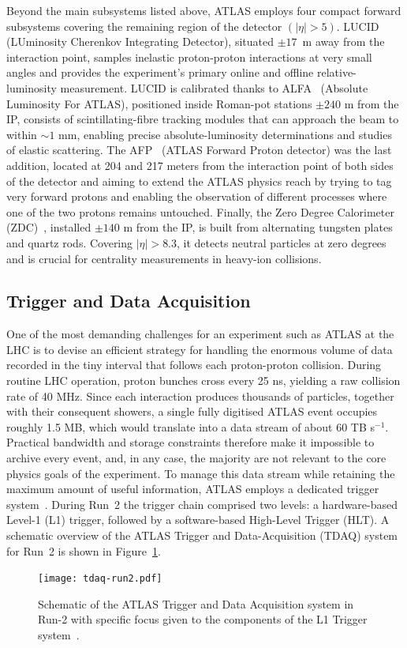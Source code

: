 Beyond the main subsystems listed above, ATLAS employs four compact forward subsystems covering the remaining region of the detector $(|\eta| > 5)$.
LUCID~\cite{Jenni:721908} (LUminosity Cherenkov Integrating Detector), situated $\pm17$~m away from the interaction point, samples inelastic proton-proton interactions at very small angles and provides the experiment’s primary online and offline relative-luminosity measurement.  
LUCID is calibrated thanks to ALFA~\cite{Khalek_2016} (Absolute Luminosity For ATLAS), positioned inside Roman-pot stations $\pm240$ m from the IP, consists of scintillating-fibre tracking modules that can approach the beam to within $\sim\!1$ mm, enabling precise absolute-luminosity determinations and studies of elastic scattering.  
The AFP~\cite{Adamczyk:2015cjy} (ATLAS Forward Proton detector) was the last addition, located at 204 and 217 meters from the interaction point of both sides of the detector and aiming to extend the ATLAS physics reach by trying to tag very forward protons and enabling the observation of different processes where one of the two protons remains untouched.
Finally, the Zero Degree Calorimeter (ZDC)~\cite{Jenni:1009649}, installed $\pm140$ m from the IP, is built from alternating tungsten plates and quartz rods.  Covering $|\eta| > 8.3$, it detects neutral particles at zero degrees and is crucial for centrality measurements in heavy-ion collisions.

\subsection{Trigger and Data Acquisition}
\label{sec:trigger}
One of the most demanding challenges for an experiment such as ATLAS at the LHC is to devise an efficient strategy for handling the enormous volume of data recorded in the tiny interval that follows each proton-proton collision. During routine LHC operation, proton bunches cross every 25 ns, yielding a raw collision rate of 40 MHz. Since each interaction produces thousands of particles, together with their consequent showers, a single fully digitised ATLAS event occupies roughly 1.5 MB, which would translate into a data stream of about 60 TB s$^{-1}$. Practical bandwidth and storage constraints therefore make it impossible to archive every event, and, in any case, the majority are not relevant to the core physics goals of the experiment. To manage this data stream while retaining the maximum amount of useful information, ATLAS employs a dedicated trigger system~\cite{trigger_run2}. During Run~2 the trigger chain comprised two levels: a hardware-based Level-1 (L1) trigger, followed by a software-based High-Level Trigger (HLT). A schematic overview of the ATLAS Trigger and Data-Acquisition (TDAQ) system for Run~2 is shown in Figure~\ref{fig:trigger_system}.
\begin{figure}[htbp]
    \centering
        \texttt{[image: tdaq-run2.pdf]}
    \caption{Schematic of the ATLAS Trigger and Data Acquisition system in Run-2 with specific focus given to the components of the L1 Trigger system~\cite{atlas_daq_run2}.}
    \label{fig:trigger_system}
\end{figure}

